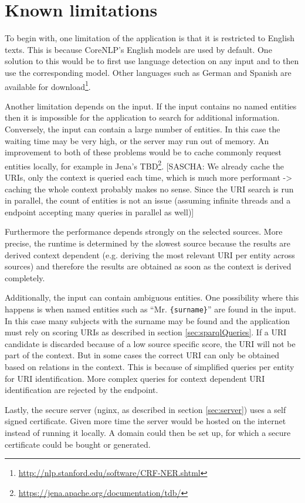 \section{Known limitations}
\label{sec:Limits}
To begin with, one limitation of the application is that it is restricted to English texts. This is because CoreNLP's English models are used by default. One solution to this would be to first use language detection on any input and to then use the corresponding model. Other languages such as German and Spanish are available for download\footnote{\url{http://nlp.stanford.edu/software/CRF-NER.shtml}}. 

Another limitation depends on the input. If the input contains no named entities then it is impossible for the application to search for additional information. Conversely, the input can contain a large number of entities. In this case the waiting time may be very high, or the server may run out of memory. An improvement to both of these problems would be to cache commonly request entities locally, for example in Jena's TBD\footnote{\url{https://jena.apache.org/documentation/tdb/}}. [SASCHA: We already cache the URIs, only the context is queried each time, which is much more performant -> caching the whole context probably makes no sense. Since the URI search is run in parallel, the count of entities is not an issue (assuming infinite threads and a endpoint accepting many queries in parallel as well)]  

Furthermore the performance depends strongly on the selected sources. More precise, the runtime is determined by the slowest source because the results are derived context dependent (e.g. deriving the most relevant URI per entity across sources) and therefore the results are obtained as soon as the context is derived completely. 

Additionally, the input can contain ambiguous entities. One possibility where this happens is when named entities such as ``Mr. \texttt{\{surname\}}'' are found in the input. In this case many subjects with the surname may be found and the application must rely on scoring URIs as described in section \ref{sec:sparqlQueries}. If a URI candidate is discarded because of a low source specific score, the URI will not be part of the context. But in some cases the correct URI can only be obtained based on relations in the context. This is because of simplified queries per entity for URI identification. More complex queries for context dependent URI identification are rejected by the endpoint.

Lastly, the secure server (nginx, as described in section \ref{sec:server}) uses a self signed certificate. Given more time the server would be hosted on the internet instead of running it locally. A domain could then be set up, for which a secure certificate could be bought or generated. 




